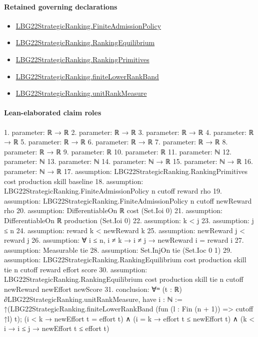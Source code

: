 \documentclass[10pt]{article}
\begin{document}
\paragraph{Retained governing declarations}
\begin{itemize}\raggedright
\item \hyperlink{paper-prerequisite-d056dd7c8060653c}{LBG22\allowbreak{}Strategic\allowbreak{}Ranking.\allowbreak{}Finite\allowbreak{}Admission\allowbreak{}Policy}
\item \hyperlink{paper-prerequisite-2a1b692f4e3136c6}{LBG22\allowbreak{}Strategic\allowbreak{}Ranking.\allowbreak{}Ranking\allowbreak{}Equilibrium}
\item \hyperlink{paper-prerequisite-9bbcc12f4a1736bf}{LBG22\allowbreak{}Strategic\allowbreak{}Ranking.\allowbreak{}Ranking\allowbreak{}Primitives}
\item \hyperlink{paper-prerequisite-a42f440ddc254fa7}{LBG22\allowbreak{}Strategic\allowbreak{}Ranking.\allowbreak{}finite\allowbreak{}Lower\allowbreak{}Rank\allowbreak{}Band}
\item \hyperlink{governing-declaration-678cf48d549cb620}{LBG22\allowbreak{}Strategic\allowbreak{}Ranking.\allowbreak{}unit\allowbreak{}Rank\allowbreak{}Measure}
\end{itemize}
\paragraph{Lean-elaborated claim roles}\begin{ReviewVerbatim}
1. parameter: ℝ → ℝ
2. parameter: ℝ → ℝ
3. parameter: ℝ → ℝ
4. parameter: ℝ → ℝ
5. parameter: ℝ → ℝ
6. parameter: ℝ → ℝ
7. parameter: ℝ → ℝ
8. parameter: ℝ → ℝ
9. parameter: ℝ
10. parameter: ℝ
11. parameter: ℕ
12. parameter: ℕ
13. parameter: ℕ
14. parameter: ℕ → ℝ
15. parameter: ℕ → ℝ
16. parameter: ℕ → ℝ
17. assumption: LBG22StrategicRanking.RankingPrimitives cost production skill baseline
18. assumption: LBG22StrategicRanking.FiniteAdmissionPolicy n cutoff reward rho
19. assumption: LBG22StrategicRanking.FiniteAdmissionPolicy n cutoff newReward rho
20. assumption: DifferentiableOn ℝ cost (Set.Ioi 0)
21. assumption: DifferentiableOn ℝ production (Set.Ioi 0)
22. assumption: k < j
23. assumption: j ≤ n
24. assumption: reward k < newReward k
25. assumption: newReward j < reward j
26. assumption: ∀ i ≤ n, i ≠ k → i ≠ j → newReward i = reward i
27. assumption: Measurable tie
28. assumption: Set.InjOn tie (Set.Ioc 0 1)
29. assumption: LBG22StrategicRanking.RankingEquilibrium cost production skill tie n cutoff reward effort score
30. assumption: LBG22StrategicRanking.RankingEquilibrium cost production skill tie n cutoff newReward newEffort newScore
31. conclusion: ∀ᵐ (t : ℝ) ∂LBG22StrategicRanking.unitRankMeasure,
  have i : ℕ := ↑(LBG22StrategicRanking.finiteLowerRankBand (fun (l : Fin (n + 1)) => cutoff ↑l) t);
  (i < k → newEffort t = effort t) ∧ (i = k → effort t ≤ newEffort t) ∧ (k < i → i ≤ j → newEffort t ≤ effort t)
\end{ReviewVerbatim}
\end{document}
